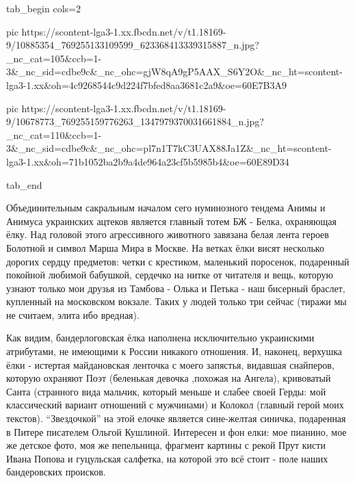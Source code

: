 \ifcmt
  tab_begin cols=2

     pic https://scontent-lga3-1.xx.fbcdn.net/v/t1.18169-9/10885354_769255133109599_623368413339315887_n.jpg?_nc_cat=105&ccb=1-3&_nc_sid=cdbe9c&_nc_ohc=gjW8qA9gP5AAX_S6Y2O&_nc_ht=scontent-lga3-1.xx&oh=4c9268544c9d224f7bfed8aa3681c2a9&oe=60E7B3A9

     pic https://scontent-lga3-1.xx.fbcdn.net/v/t1.18169-9/10678773_769255159776263_1347979370031661884_n.jpg?_nc_cat=110&ccb=1-3&_nc_sid=cdbe9c&_nc_ohc=pl7n1T7kC3UAX88Ja1Z&_nc_ht=scontent-lga3-1.xx&oh=71b1052ba2b9a4de964a23cf5b5985b4&oe=60E89D34

  tab_end
\fi


Объединительным сакральным началом сего нуминозного тендема Анимы и Анимуса
украинских ацтеков является главный тотем БЖ - Белка, охраняющая ёлку. Над
головой этого агрессивного животного завязана белая лента героев Болотной и
символ Марша Мира в Москве. На ветках ёлки висят несколько дорогих сердцу
предметов: четки с крестиком, маленький поросенок, подаренный покойной любимой
бабушкой, сердечко на нитке от читателя и вещь, которую узнают только мои
друзья из Тамбова - Олька и Петька - наш бисерный браслет, купленный на
московском вокзале. Таких у людей только три сейчас (тиражи мы не считаем,
элита ибо вредная). 

Как видим, бандерлоговская ёлка наполнена исключительно украинскими атрибутами,
не имеющими к России никакого отношения. И, наконец, верхушка ёлки - истертая
майдановская ленточка с моего запястья, видавшая снайперов, которую охраняют
Поэт (беленькая девочка ,похожая на Ангела), кривоватый Санта (странного вида
мальчик, который меньше и слабее своей Герды: мой классический вариант
отношений с мужчинами) и Колокол (главный герой моих текстов). \enquote{Звездочкой} на
этой елочке является сине-желтая синичка, подаренная в Питере писателем Ольгой
Кушлиной. Интересен и фон елки: мое пианино, мое же детское фото, моя же
пепельница, фрагмент картины с рекой Прут кисти Ивана Попова и гуцульская
салфетка, на которой это всё стоит - поле наших бандеровских происков.

